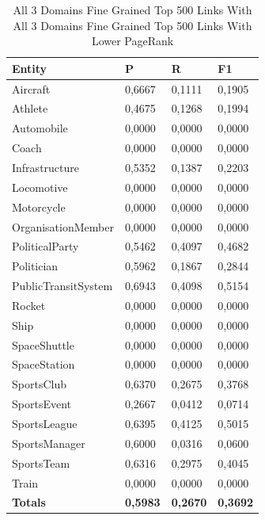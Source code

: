 \documentclass[thesis=M,english]{FITthesis}[2018/05/30]
\begin{document}
\begin{table}[H]\centering
		\label{}
		\begin{tabular}{|l|l|l|l|}
			\hline {\textbf{Entity}} & {\textbf{P}} & {\textbf{R}} & {\textbf{F1}}\\\hline
				Aircraft & 0,6667 & 0,1111 & 0,1905\\
				Athlete & 0,4675 & 0,1268 & 0,1994\\
				Automobile & 0,0000 & 0,0000 & 0,0000\\ 
				Coach & 0,0000 & 0,0000 & 0,0000\\
				Infrastructure & 0,5352 & 0,1387 & 0,2203\\
				Locomotive & 0,0000 & 0,0000 & 0,0000\\
				Motorcycle & 0,0000 & 0,0000 & 0,0000\\
				OrganisationMember & 0,0000 & 0,0000 & 0,0000\\				
				PoliticalParty & 0,5462 & 0,4097 & 0,4682\\
				Politician & 0,5962 & 0,1867 & 0,2844\\
				PublicTransitSystem & 0,6943 & 0,4098 & 0,5154\\
				Rocket & 0,0000 & 0,0000 & 0,0000\\				
				Ship & 0,0000 & 0,0000 & 0,0000\\
				SpaceShuttle & 0,0000 & 0,0000 & 0,0000\\
				SpaceStation & 0,0000 & 0,0000 & 0,0000\\ 
				SportsClub & 0,6370 & 0,2675 & 0,3768\\
				SportsEvent & 0,2667 & 0,0412 & 0,0714\\
				SportsLeague & 0,6395 & 0,4125 & 0,5015\\
				SportsManager & 0,6000 & 0,0316 & 0,0600\\
				SportsTeam & 0,6316 & 0,2975 & 0,4045\\
				Train & 0,0000 & 0,0000 & 0,0000\\\hline
				\textbf{Totals} & \textbf{0,5983} & \textbf{0,2670} & \textbf{0,3692}\\\hline
		\end{tabular}
		\caption{All 3 Domains Fine Grained Top 500 Links With All 3 Domains Fine Grained Top 500 Links With Lower PageRank}
	\end{table}
\end{document}
